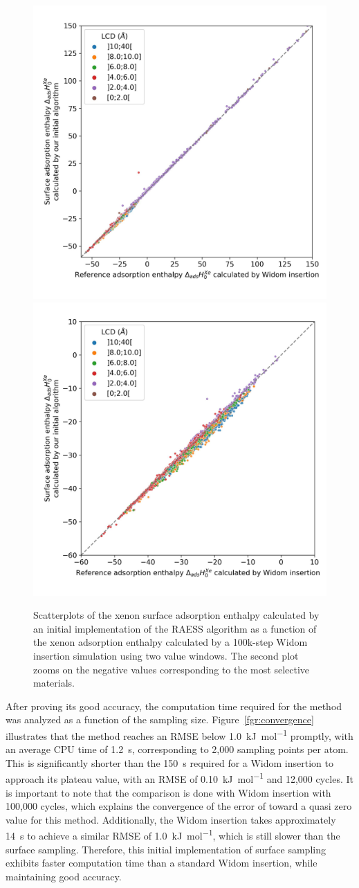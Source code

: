 \documentclass[main]{subfiles}
\begin{document}
\begin{figure}[ht]
  \centering
  \includegraphics[width=0.45\linewidth]{figures/3-fastsim/H_Xe_widom_vs_H_Xe_surface_spiral_overview.jpg}
  \includegraphics[width=0.45\linewidth]{figures/3-fastsim/H_Xe_widom_vs_H_Xe_surface_spiral_zoom.jpg}
    \caption{Scatterplots of the xenon surface adsorption enthalpy calculated by an initial implementation of the RAESS algorithm as a function of the xenon adsorption enthalpy calculated by a 100k-step Widom insertion simulation using two value windows. The second plot zooms on the negative values corresponding to the most selective materials.}\label{fgr:surface_sampling_init}
\end{figure}

After proving its good accuracy, the computation time required for the method was analyzed as a function of the sampling size. Figure~\ref{fgr:convergence} illustrates that the method reaches an RMSE below \SI{1.0}{\kilo\joule\per\mole} promptly, with an average CPU time of \SI{1.2}{\second}, corresponding to 2,000 sampling points per atom. This is significantly shorter than the \SI{150}{\second} required for a Widom insertion to approach its plateau value, with an RMSE of \SI{0.10}{\kilo\joule\per\mole} and 12,000 cycles. It is important to note that the comparison is done with Widom insertion with 100,000 cycles, which explains the convergence of the error of toward a quasi zero value for this method. Additionally, the Widom insertion takes approximately \SI{14}{\second} to achieve a similar RMSE of \SI{1.0}{\kilo\joule\per\mole}, which is still slower than the surface sampling. Therefore, this initial implementation of surface sampling exhibits faster computation time than a standard Widom insertion, while maintaining good accuracy.
\end{document}
